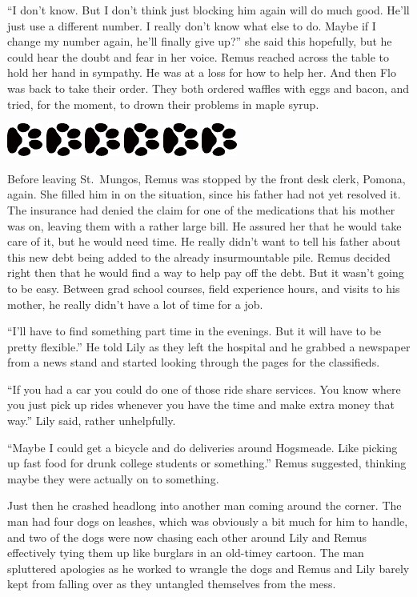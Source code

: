 \documentclass[12pt,twoside,openright]{memoir}
\newcommand{\dogPrintRule}{	
	\begin{center}
		\hspace{.5em}
		\includegraphics[angle=60]{dogprint.pdf}
		\hspace{.5em}
		\includegraphics[angle=120]{dogprint.pdf}
		\hspace{.5em}
		\includegraphics[angle=60]{dogprint.pdf}
		\hspace{.5em}
		\includegraphics[angle=120]{dogprint.pdf}
		\hspace{.5em}
		\includegraphics[angle=60]{dogprint.pdf}
		\hspace{.5em}
		\includegraphics[angle=120]{dogprint.pdf}
		\hspace{.5em}
	\end{center}
}
\begin{document}
``I don't know. But I don't think just blocking him again will do much good. He'll just use a different number. I really don't know what else to do. Maybe if I change my number again, he'll finally give up?'' she said this hopefully, but he could hear the doubt and fear in her voice. Remus reached across the table to hold her hand in sympathy. He was at a loss for how to help her. And then Flo was back to take their order. They both ordered waffles with eggs and bacon, and tried, for the moment, to drown their problems in maple syrup.

\dogPrintRule

Before leaving St.\ Mungos, Remus was stopped by the front desk clerk, Pomona, again. She filled him in on the situation, since his father had not yet resolved it. The insurance had denied the claim for one of the medications that his mother was on, leaving them with a rather large bill. He assured her that he would take care of it, but he would need time. He really didn't want to tell his father about this new debt being added to the already insurmountable pile. Remus decided right then that he would find a way to help pay off the debt. But it wasn't going to be easy. Between grad school courses, field experience hours, and visits to his mother, he really didn't have a lot of time for a job.

``I'll have to find something part time in the evenings. But it will have to be pretty flexible.'' He told Lily as they left the hospital and he grabbed a newspaper from a news stand and started looking through the pages for the classifieds.

``If you had a car you could do one of those ride share services. You know where you just pick up rides whenever you have the time and make extra money that way.'' Lily said, rather unhelpfully.

``Maybe I could get a bicycle and do deliveries around Hogsmeade. Like picking up fast food for drunk college students or something.'' Remus suggested, thinking maybe they were actually on to something.

Just then he crashed headlong into another man coming around the corner. The man had four dogs on leashes, which was obviously a bit much for him to handle, and two of the dogs were now chasing each other around Lily and Remus effectively tying them up like burglars in an old-timey cartoon. The man spluttered apologies as he worked to wrangle the dogs and Remus and Lily barely kept from falling over as they untangled themselves from the mess.
\end{document}
